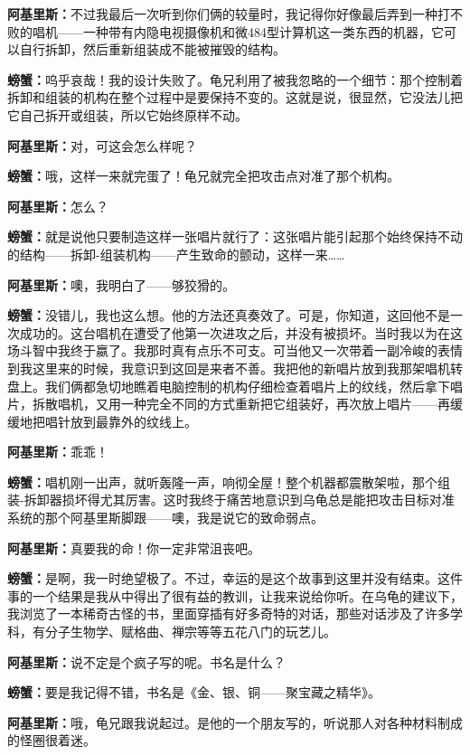 \documentclass[
  12pt,
  twoside,
  openright,
  oldfontcommands,
]{memoir}
\newcommand{\dialogname}[1]{{\heifamily\bfseries #1}}
\begin{document}
\dialogname{阿基里斯：}不过我最后一次听到你们俩的较量时，我记得你好像最后弄到一种打不败的唱机------一种带有内隐电视摄像机和微484型计算机这一类东西的机器，它可以自行拆卸，然后重新组装成不能被摧毁的结构。

\dialogname{螃蟹：}呜乎哀哉！我的设计失败了。龟兄利用了被我忽略的一个细节：那个控制着拆卸和组装的机构在整个过程中是要保持不变的。这就是说，很显然，它没法儿把它自己拆开或组装，所以它始终原样不动。

\dialogname{阿基里斯：}对，可这会怎么样呢？

\dialogname{螃蟹：}哦，这样一来就完蛋了！龟兄就完全把攻击点对准了那个机构。

\dialogname{阿基里斯：}怎么？

\dialogname{螃蟹：}就是说他只要制造这样一张唱片就行了：这张唱片能引起那个始终保持不动的结构------拆卸-组装机构------产生致命的颤动，这样一来\ldots\ldots{}

\dialogname{阿基里斯：}噢，我明白了------够狡猾的。

\dialogname{螃蟹：}没错儿，我也这么想。他的方法还真奏效了。可是，你知道，这回他不是一次成功的。这台唱机在遭受了他第一次进攻之后，并没有被损坏。当时我以为在这场斗智中我终于嬴了。我那时真有点乐不可支。可当他又一次带着一副冷峻的表情到我这里来的时候，我意识到这回是来者不善。我把他的新唱片放到我那架唱机转盘上。我们俩都急切地瞧着电脑控制的机构仔细检查着唱片上的纹线，然后拿下唱片，拆散唱机，又用一种完全不同的方式重新把它组装好，再次放上唱片------再缓缓地把唱针放到最靠外的纹线上。

\dialogname{阿基里斯：}乖乖！

\dialogname{螃蟹：}唱机刚一出声，就听轰隆一声，响彻全屋！整个机器都震散架啦，那个组装-拆卸器损坏得尤其厉害。这时我终于痛苦地意识到乌龟总是能把攻击目标对准系统的那个阿基里斯脚跟------噢，我是说它的致命弱点。

\dialogname{阿基里斯：}真要我的命！你一定非常沮丧吧。

\dialogname{螃蟹：}是啊，我一时绝望极了。不过，幸运的是这个故事到这里并没有结束。这件事的一个结果是我从中得出了很有益的教训，让我来说给你听。在乌龟的建议下，我浏览了一本稀奇古怪的书，里面穿插有好多奇特的对话，那些对话涉及了许多学科，有分子生物学、赋格曲、禅宗等等五花八门的玩艺儿。

\dialogname{阿基里斯：}说不定是个疯子写的呢。书名是什么？

\dialogname{螃蟹：}要是我记得不错，书名是《金、银、铜------聚宝藏之精华》。

\dialogname{阿基里斯：}哦，龟兄跟我说起过。是他的一个朋友写的，听说那人对各种材料制成的怪圈很着迷。
\end{document}
